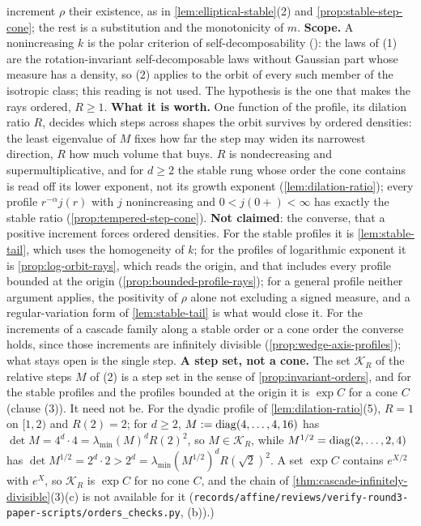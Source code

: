 \begin{proposition}
{increment $\rho$ their existence, as in \ref{lem:elliptical-stable}(2) and
\ref{prop:stable-step-cone}; the rest is a substitution and the monotonicity of $m$.
\textbf{Scope.} A nonincreasing $k$ is the polar criterion of self-decomposability ():
the laws of (1) are the rotation-invariant self-decomposable laws without Gaussian part whose \Levy{}
measure has a density, so (2) applies to the orbit of every such member of the isotropic class; this
reading is not used. The hypothesis is the one that makes the rays ordered, $R \ge 1$. \textbf{What it is worth.}
One function of the profile, its dilation ratio $R$, decides which steps across shapes the orbit
survives by ordered \Levy{} densities: the least eigenvalue of $M$ fixes how far the step may widen
its narrowest direction, $R$ how much volume that buys. $R$ is nondecreasing and supermultiplicative,
and for $d \ge 2$ the stable rung whose order the cone contains is read off its lower exponent, not
its growth exponent (\ref{lem:dilation-ratio}); every profile $r^{-\alpha}j(r)$ with $j$ nonincreasing and
$0 < j(0{+}) < \infty$ has exactly the stable ratio (\ref{prop:tempered-step-cone}). \textbf{Not claimed}: the converse, that a positive increment forces ordered densities.
For the stable profiles it is \ref{lem:stable-tail}, which uses the homogeneity of $k$; for the
profiles of logarithmic exponent it is \ref{prop:log-orbit-rays}, which reads the origin, and that
includes every profile bounded at the origin (\ref{prop:bounded-profile-rays}); for a
general profile neither argument applies, the positivity of $\rho$ alone not excluding a signed
\Levy{} measure, and a regular-variation form of \ref{lem:stable-tail} is what would close it. For the increments of a cascade family along a stable order or a cone order the converse holds, since those
increments are infinitely divisible (\ref{prop:wedge-axis-profiles}); what stays open is the single step.
\textbf{A step set, not a cone.} The set $\mathcal K_R$ of the relative steps $M$ of (2) is a step set in the
sense of \ref{prop:invariant-orders}, and for the stable profiles and the profiles bounded at the origin it is
$\exp C$ for a cone $C$ (clause (3)). It need not be. For the dyadic profile of \ref{lem:dilation-ratio}(5),
$R = 1$ on $[1, 2)$ and $R(2) = 2$; for $d \ge 2$, $M := \operatorname{diag}(4, \dots, 4, 16)$ has
$\det M = 4^d\cdot 4 = \lambda_{\min}(M)^dR(2)^2$, so $M \in \mathcal K_R$, while
$M^{1/2} = \operatorname{diag}(2, \dots, 2, 4)$ has $\det M^{1/2} = 2^d\cdot 2 > 2^d = \lambda_{\min}(M^{1/2})^dR(\sqrt2)^2$.
A set $\exp C$ contains $e^{X/2}$ with $e^X$, so $\mathcal K_R$ is $\exp C$ for no cone $C$, and the chain
of \ref{thm:cascade-infinitely-divisible}(3)(c) is not available for it
(\texttt{records/affine/reviews/verify-round3-paper-scripts/orders\_checks.py}, (b)).)}
\end{proposition}

